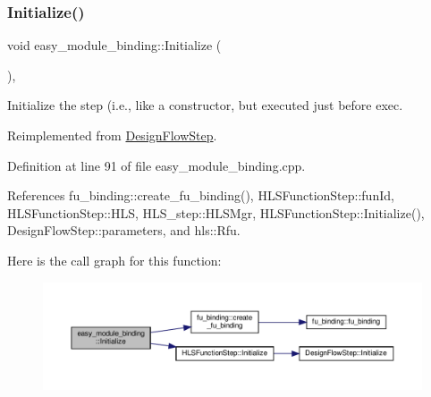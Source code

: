 \mbox{\label{classeasy__module__binding_a965941b4523dc46f21b2fade436d46db}} 
\subsubsection{\texorpdfstring{Initialize()}{Initialize()}}
{\footnotesize\ttfamily void easy\+\_\+module\+\_\+binding\+::\+Initialize (\begin{DoxyParamCaption}{ }\end{DoxyParamCaption})\hspace{0.3cm}{\ttfamily [override]}, {\ttfamily [virtual]}}



Initialize the step (i.\+e., like a constructor, but executed just before exec. 



Reimplemented from \hyperlink{classDesignFlowStep_a44b50683382a094976e1d432a7784799}{Design\+Flow\+Step}.



Definition at line 91 of file easy\+\_\+module\+\_\+binding.\+cpp.



References fu\+\_\+binding\+::create\+\_\+fu\+\_\+binding(), H\+L\+S\+Function\+Step\+::fun\+Id, H\+L\+S\+Function\+Step\+::\+H\+LS, H\+L\+S\+\_\+step\+::\+H\+L\+S\+Mgr, H\+L\+S\+Function\+Step\+::\+Initialize(), Design\+Flow\+Step\+::parameters, and hls\+::\+Rfu.

Here is the call graph for this function\+:
\nopagebreak
\begin{figure}[H]
\begin{center}
\leavevmode
\includegraphics[width=350pt]{d6/d61/classeasy__module__binding_a965941b4523dc46f21b2fade436d46db_cgraph}
\end{center}
\end{figure}
\mbox{\label{classeasy__module__binding_a679ec36974c9d93a34c944f62f7e0170}} 

